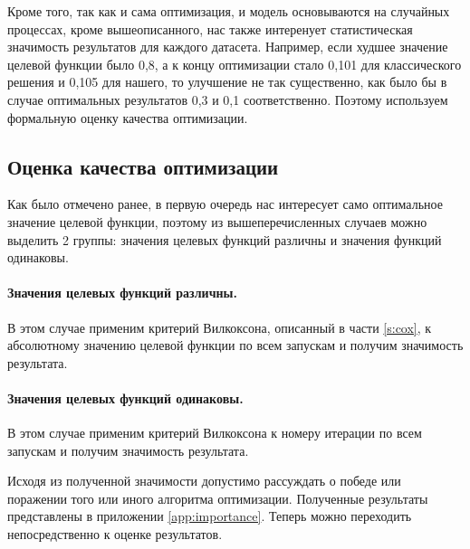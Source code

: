 \documentclass[times,specification,annotation]{itmo-student-thesis}
\begin{document}
	Кроме того, так как и сама оптимизация, и модель основываются на случайных процессах, кроме вышеописанного, нас также интеренует статистическая значимость результатов для каждого датасета. Например, если худшее значение целевой функции было 0,8, а к концу оптимизации стало 0,101 для классического решения и 0,105 для нашего, то улучшение не так существенно, как было бы в случае оптимальных результатов 0,3 и 0,1 соответственно. Поэтому используем формальную оценку качества оптимизации.
	
	\subsection{Оценка качества оптимизации}
	Как было отмечено ранее, в первую очередь нас интересует само оптимальное значение целевой функции, поэтому из вышеперечисленных случаев можно выделить 2 группы: значения целевых функций различны и значения функций одинаковы. 
	\paragraph{Значения целевых функций различны.} В этом случае применим критерий Вилкоксона, описанный в части \ref{s:cox}, к абсолютному значению целевой функции по всем запускам и получим значимость результата.
	\paragraph{Значения целевых функций одинаковы.} \label{pr:equalac} В этом случае применим критерий Вилкоксона к номеру итерации по всем запускам и получим значимость результата. \par 
	
	Исходя из полученной значимости допустимо рассуждать о победе или поражении того или иного алгоритма оптимизации. Полученные результаты представлены в приложении \ref{app:importance}. Теперь можно переходить непосредственно к оценке результатов.
	
\end{document}
